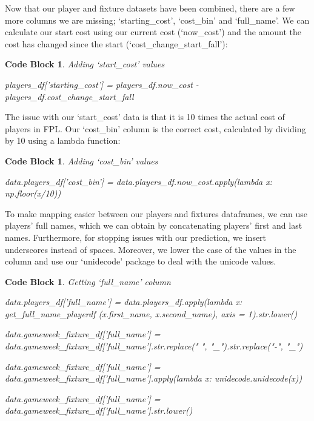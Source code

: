 \documentclass[12pt, a4paper, oneside]{book}
\newtheorem{codeblock}[theorem]{Code Block}
\numberwithin{equation}{section}
\begin{document}
\vspace{0.5cm}

Now that our player and fixture datasets have been combined, there are a few more columns we are missing; `starting\_cost', `cost\_bin' and `full\_name'. We can calculate our start cost using our current cost (`now\_cost') and the amount the cost has changed since the start (`cost\_change\_start\_fall'):

\begin{codeblock}
  Adding `start\_cost' values

  players\_df['starting\_cost'] = players\_df.now\_cost - players\_df.cost\_change\_start\_fall
\end{codeblock}

The issue with our `start\_cost' data is that it is 10 times the actual cost of players in FPL. Our `cost\_bin' column is the correct cost, calculated by dividing by 10 using a lambda function:

\begin{codeblock}
  Adding `cost\_bin' values

  data.players\_df['cost\_bin'] = data.players\_df.now\_cost.apply(lambda x: np.floor(x/10))
\end{codeblock}

\vspace{0.5cm}

To make mapping easier between our players and fixtures dataframes, we can use players' full names, which we can obtain by concatenating players' first and last names. Furthermore, for stopping issues with our prediction, we insert underscores instead of spaces. Moreover, we lower the case of the values in the column and use our `unidecode' package \cite{unidecode} to deal with the unicode values.

\begin{codeblock}
  Getting `full\_name' column

  data.players\_df['full\_name'] = data.players\_df.apply(lambda x: get\_full\_name\_playerdf (x.first\_name, x.second\_name), axis = 1).str.lower()
  
  data.gameweek\_fixture\_df['full\_name'] = data.gameweek\_fixture\_df['full\_name'].str.replace(" ", "\_").str.replace("-", "\_")
  
  data.gameweek\_fixture\_df['full\_name'] = data.gameweek\_fixture\_df['full\_name'].apply(lambda x: unidecode.unidecode(x))
  
  data.gameweek\_fixture\_df['full\_name'] = data.gameweek\_fixture\_df['full\_name'].str.lower()

\end{codeblock}
\end{document}
